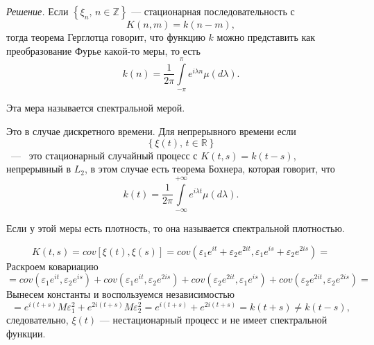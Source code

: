 \textit{Решение.}
Если $ \left\{ \xi_n, \, n \in \mathbb{Z} \right\} $ ---
стационарная последовательность с
$$K \left( n, m \right) =
  k \left( n - m \right),$$
тогда теорема Герглотца говорит,
что функцию $k$ можно представить как преобразование Фурье какой-то меры, то есть
$$k \left( n \right) =
  \frac{1}{2 \pi } \int \limits_{-\pi }^{ \pi } e^{i \lambda n} \mu \left( d \lambda \right).$$

Эта мера называется спектральной мерой.

Это в случае дискретного времени.
Для непрерывного времени если
$$ \left\{ \xi \left( t \right), \, t \in \mathbb{R} \right\} $$~---~
это стационарный случайный процесс с $K \left( t, s \right) = k \left( t - s \right) $,
непрерывный в $L_2$, в этом случае есть теорема Бохнера, которая говорит, что
$$k \left( t \right) =
  \frac{1}{2 \pi }
  \int \limits_{-\infty }^{+\infty } e^{i \lambda t} \mu \left( d \lambda \right).$$

Если у этой меры есть плотность, то она называется спектральной плотностью.

$$K \left( t, s \right) =
  cov \left[ \xi \left( t \right), \xi \left( s \right) \right] =
  cov \left(
    \varepsilon_1 e^{it} + \varepsilon_2 e^{2it}, \varepsilon_1 e^{is} + \varepsilon_2 e^{2is}
  \right) =$$
Раскроем ковариацию
$$= cov \left( \varepsilon_1 e^{it}, \varepsilon_2 e^{is} \right) +
  cov \left( \varepsilon_1 e^{it}, \varepsilon_2 e^{2is} \right) +
  cov \left( \varepsilon_2 e^{2it}, \varepsilon_1 e^{is} \right) +
  cov \left( \varepsilon_2 e^{2it}, \varepsilon_2 e^{2is} \right) =$$
Вынесем константы и воспользуемся независимостью
$$= e^{i \left( t + s \right) } M \varepsilon_1^2 + e^{2i \left( t + s \right) } M \varepsilon_2^2 =
  e^{i \left( t + s \right) } + e^{2i \left( t + s \right) } =
  k \left( t + s \right) \neq
  k \left( t - s \right),$$
следовательно, $ \xi \left( t \right) $ --- нестационарный процесс и не имеет спектральной функции.
